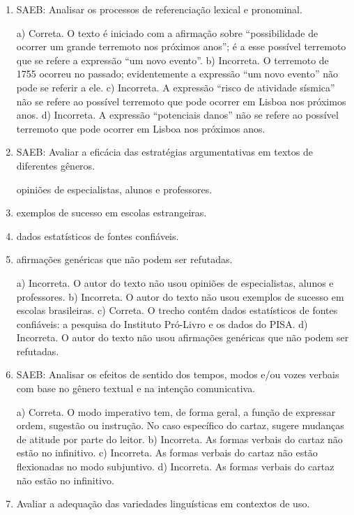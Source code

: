 \begin{enumerate}
\item
SAEB: Analisar os processos de referenciação lexical e pronominal.

a) Correta. O texto é iniciado com a afirmação sobre ``possibilidade
de ocorrer um grande terremoto nos próximos anos''; é a esse possível terremoto que se refere a expressão ``um novo evento''. 
b) Incorreta. O terremoto de 1755 ocorreu no passado; evidentemente a expressão ``um novo evento'' não pode se referir a ele.
c) Incorreta. A expressão ``risco de atividade sísmica'' não se refere ao possível terremoto que pode ocorrer em Lisboa nos próximos anos.
d) Incorreta. A expressão ``potenciais danos'' não se refere ao possível terremoto que pode ocorrer em Lisboa nos próximos anos.

\item
SAEB: Avaliar a eficácia das estratégias argumentativas em textos de
diferentes gêneros.

opiniões de especialistas, alunos e professores.

    \item exemplos de sucesso em escolas estrangeiras. 

    \item dados estatísticos de fontes confiáveis.

    \item afirmações genéricas que não podem ser refutadas. 

a) Incorreta. O autor do texto não usou opiniões de especialistas, alunos e professores.
b) Incorreta. O autor do texto não usou exemplos de sucesso em escolas brasileiras.
c) Correta. O trecho contém dados estatísticos de fontes confiáveis: a pesquisa do Instituto Pró-Livro e os dados do PISA.
d) Incorreta. O autor do texto não usou afirmações genéricas que não podem ser refutadas.

\item
SAEB: Analisar os efeitos de sentido dos tempos, modos e/ou
vozes verbais com base no gênero textual e na intenção comunicativa.
 
a) Correta. O modo imperativo tem, de forma geral, a função de expressar
ordem, sugestão ou instrução. No caso específico do cartaz, sugere mudanças
de atitude por parte do leitor.
b) Incorreta. As formas verbais do cartaz não estão no infinitivo.
c) Incorreta. As formas verbais do cartaz não estão flexionadas no modo subjuntivo.
d) Incorreta. As formas verbais do cartaz não estão no infinitivo.

\item
Avaliar a adequação das variedades linguísticas em contextos de uso.


\end{enumerate}
